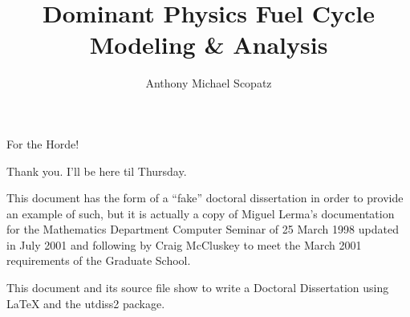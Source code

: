 \documentclass[12pt]{report}    %
\author{Anthony Michael Scopatz}    %
\title{Dominant Physics Fuel Cycle Modeling \& Analysis}    %
\theoremstyle{definition}
\theoremstyle{remark}
\begin{document}
\copyrightpage  %


%
%
%
\commcertpage   %

\titlepage      %



%
\begin{dedication}
%
For the Horde!
\end{dedication}


\begin{acknowledgments}		%
%
Thank you.  I'll be here til Thursday.
\end{acknowledgments}


%
\utabstract
{}%
\indent
This document has the form of a ``fake'' doctoral dissertation
in order to provide an example of such, but it is actually a
copy of Miguel Lerma's documentation for the Mathematics
Department Computer Seminar of 25 March 1998 updated in July 2001
and following by Craig McCluskey to meet the March 2001
requirements of the Graduate School.

This document and its source file show to write a Doctoral Dissertation using 
\LaTeX{} and the utdiss2 package. 



\tableofcontents   %

\listoftables      %
\listoffigures     %
\end{document}
